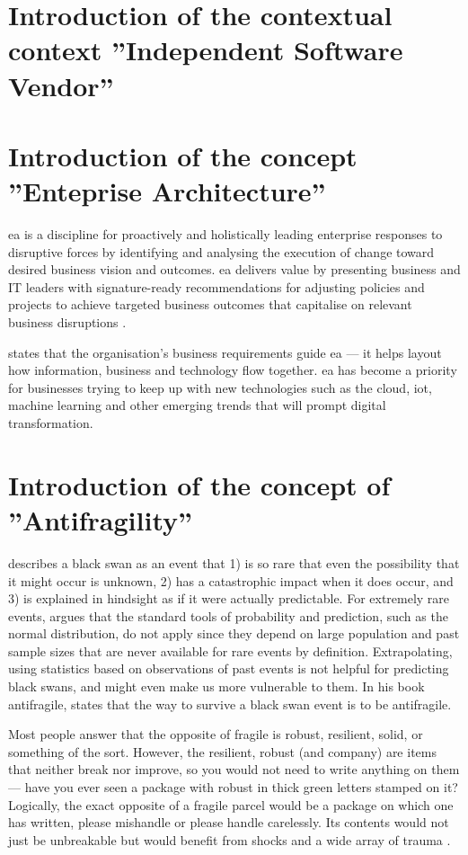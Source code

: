 \section{Introduction of the contextual context ''Independent Software Vendor''}
\label{sec:introisv}

\section{Introduction of the concept ''Enteprise Architecture''}
\label{introea}
\acrfull{ea} is a discipline for proactively and holistically leading enterprise responses to disruptive forces by identifying and analysing the execution of change toward desired business vision and outcomes. \acrshort{ea} delivers value by presenting business and IT leaders with signature-ready recommendations for adjusting policies and projects to achieve targeted business outcomes that capitalise on relevant business disruptions \parencite{Gartner}.\par
\textcite{White2018} states that the organisation’s business requirements guide \acrshort{ea} — it helps layout how information, business and technology flow together. \acrshort{ea} has become a priority for businesses trying to keep up with new technologies such as the cloud, \acrfull{iot}, machine learning and other emerging trends that will prompt digital transformation.

\section{Introduction of the concept of ''Antifragility''}
\label{sec:introantifragility}
\textcite{Taleb2008} describes a black swan as an event that 1) is so rare that even the possibility that it might occur is unknown, 2) has a catastrophic impact when it does occur, and 3) is explained in hindsight as if it were actually predictable. For extremely rare events, \citeauthor{Taleb2008} argues that the standard tools of probability and prediction, such as the normal distribution, do not apply since they depend on large population and past sample sizes that are never available for rare events by definition. Extrapolating, using statistics based on observations of past events is not helpful for predicting black swans, and might even make us more vulnerable to them. In his book \Gls{antifragile}, \textcite{Taleb2013} states that the way to survive a black swan event is to be \gls{antifragile}.\par
Most people answer that the opposite of \gls{fragile} is \gls{robust}, \gls{resilient}, solid, or something of the sort. However, the \gls{resilient}, \gls{robust} (and company) are items that neither break nor improve, so you would not need to write anything on them — have you ever seen a package with \gls{robust} in thick green letters stamped on it? Logically, the exact opposite of a \gls{fragile} parcel would be a package on which one has written, please mishandle or please handle carelessly. Its contents would not just be unbreakable but would benefit from shocks and a wide array of trauma \parencite{Taleb2013}.

